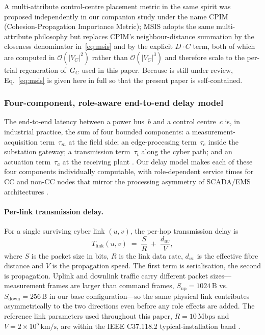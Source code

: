A multi-attribute control-centre placement metric in the same spirit
was proposed independently in our companion study \citep{ChenTu2026}
under the name CPIM (Cohesion-Propagation Importance Metric); MSIS
adopts the same multi-attribute philosophy but replaces CPIM's
neighbour-distance summation by the closeness denominator
in~\eqref{eq:msis} and by the explicit $D\cdot C$ term, both of which
are computed in $\mathcal{O}(|V_C|^2)$ rather than $\mathcal{O}(|V_C|^3)$
and therefore scale to the per-trial regeneration of~$G_C$ used in
this paper.  Because \citep{ChenTu2026} is still under review,
Eq.~\eqref{eq:msis} is given here in full so that the present paper
is self-contained.

\subsubsection{Four-component, role-aware end-to-end delay
model}\label{sec:delay_model}

The end-to-end latency between a power bus~$b$ and a control
centre~$c$ is, in industrial practice, the sum of four bounded
components: a measurement-acquisition term~$\tau_m$ at the field
side; an edge-processing term~$\tau_e$ inside the substation
gateway; a transmission term~$\tau_t$ along the cyber path; and an
actuation term~$\tau_a$ at the receiving plant
\citep{NASPI_LatencyGuidelines,IEEE_C37_118_2}.  Our delay model
makes each of these four components individually computable, with
role-dependent service times for CC and non-CC nodes that mirror the
processing asymmetry of SCADA/EMS architectures
\citep{Kundur2017CPPS}.

\paragraph{Per-link transmission delay.}
For a single surviving cyber link $(u,v)$, the per-hop transmission
delay is
\begin{equation}\label{eq:link_delay}
  T_{\text{link}}(u,v) \;=\; \frac{S}{R} \;+\; \frac{d_{uv}}{V},
\end{equation}
where $S$ is the packet size in bits, $R$ is the link data rate, $d_{uv}$
is the effective fibre distance and $V$ is the propagation speed.  The
first term is serialisation, the second is propagation.  Uplink and
downlink traffic carry different packet sizes---measurement frames
are larger than command frames, $S_{\text{up}}=1024\,\text{B}$ vs.\
$S_{\text{down}}=256\,\text{B}$ in our base configuration---so the
same physical link contributes asymmetrically to the two directions
even before any role effects are added.  The reference link
parameters used throughout this paper, $R=10\,\text{Mbps}$ and
$V=2{\times}10^{5}\,\text{km/s}$, are within the IEEE C37.118.2
typical-installation band \citep{IEEE_C37_118_2}.

